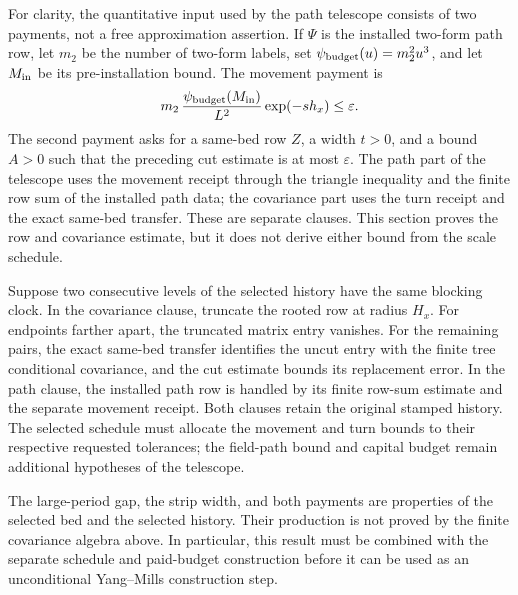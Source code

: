 For clarity, the quantitative input used by the path telescope consists of
two payments, not a free approximation assertion. If $\Psi$ is the
installed two-form path row, let $m_2$ be the number of two-form labels,
set $\psi_{\rm budget}(u)=m_2^2u^3$, and let $M_{\rm in}$ be its
pre-installation bound. The movement payment is
\[
 m_2\,\frac{\psi_{\rm budget}(M_{\rm in})}{L^2}
       \exp(-s h_x)\le \varepsilon.
\]
The second payment asks for a same-bed row $Z$, a width $t>0$, and a
bound $A>0$ such that the preceding cut estimate is at most
$\varepsilon$. The path part of the telescope uses the movement receipt
through the triangle inequality and the finite row sum of the installed
path data; the covariance part uses the turn receipt and the exact
same-bed transfer. These are separate clauses. This section proves the
row and covariance estimate, but it does not derive either bound from the
scale schedule.

Suppose two consecutive levels of the selected history have the same
blocking clock. In the covariance clause, truncate the rooted row at
radius $H_x$. For endpoints farther apart, the truncated matrix entry
vanishes. For the remaining pairs, the exact same-bed transfer identifies
the uncut entry with the finite tree conditional covariance, and the cut
estimate bounds its replacement error. In the path clause, the installed
path row is handled by its finite row-sum estimate and the separate
movement receipt. Both clauses retain the original stamped history. The
selected schedule must allocate the movement and turn bounds to their
respective requested tolerances; the field-path bound and capital budget
remain additional hypotheses of the telescope.

The large-period gap, the strip width, and both payments are properties
of the selected bed and the selected history. Their production is not
proved by the finite covariance algebra above. In particular, this result
must be combined with the separate schedule and paid-budget construction
before it can be used as an unconditional Yang--Mills construction step.
